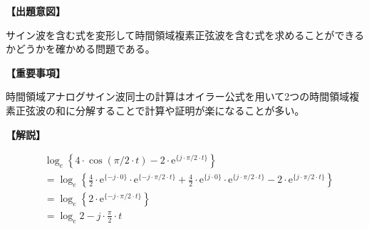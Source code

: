 \noindent \textbf{【出題意図】}

\bigskip
\noindent サイン波を含む式を変形して時間領域複素正弦波を含む式を求めることができるかどうかを確かめる問題である。

\vspace{1em}
\noindent \textbf{【重要事項】}

\medskip
\noindent 時間領域アナログサイン波同士の計算はオイラー公式を用いて2つの時間領域複素正弦波の和に分解することで計算や証明が楽になることが多い。

\bigskip

\vspace{1em}
\noindent \textbf{【解説】}

\bigskip

\begin{align*}
& 
\log_e \left \{
4 \cdot \cos(\pi/2 \cdot t) - 2 \cdot \textrm{e}^{ \{j \cdot \pi/2 \cdot t\} }
\right \} \\
& = 
\log_e \left \{
  \frac{4}{2} \cdot \textrm{e}^{\{-j \cdot 0 \}} \cdot \textrm{e}^{\{-j \cdot \pi/2 \cdot t \}} 
+ \frac{4}{2} \cdot \textrm{e}^{\{ j \cdot 0 \}} \cdot \textrm{e}^{\{ j \cdot \pi/2 \cdot t \}} 
- 2 \cdot \textrm{e}^{\{ j \cdot \pi/2 \cdot t \}} 
\right \} \\
& =
\log_e \left \{
  2 \cdot \textrm{e}^{\{-j \cdot \pi/2 \cdot t \}} 
\right \} \\
& = \log_e 2 -j \cdot \frac{\pi}{2} \cdot t 
\end{align*}


